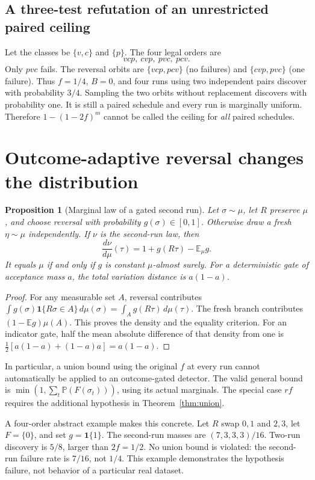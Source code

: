 \documentclass[11pt,a4paper]{article}
\newtheorem{proposition}[theorem]{Proposition}
\theoremstyle{definition}\newtheorem{definition}[theorem]{Definition}
\theoremstyle{remark}\newtheorem{remark}[theorem]{Remark}
\newcommand{\E}{\mathbb E}
\newcommand{\Prb}{\mathbb P}
\newcommand{\ind}{\mathbf 1}
\theoremstyle{definition}\newtheorem{xexample}[xtheorem]{Example}\theoremstyle{plain}
\providecommand{\ind}{\mathbf 1}
\begin{document}
\subsection{A three-test refutation of an unrestricted paired ceiling}
Let the classes be $\{v,c\}$ and $\{p\}$. The four legal orders are
\[
 vcp,\ cvp,\ pvc,\ pcv.
\]
Only $pvc$ fails. The reversal orbits are $\{vcp,pcv\}$ (no failures) and $\{cvp,pvc\}$ (one failure). Thus $f=1/4$, $B=0$, and four runs using two independent pairs discover with probability $3/4$. Sampling the two orbits without replacement discovers with probability one. It is still a paired schedule and every run is marginally uniform. Therefore $1-(1-2f)^m$ cannot be called the ceiling for \emph{all} paired schedules.

\section{Outcome-adaptive reversal changes the distribution}\label{sec:gate}
\begin{proposition}[Marginal law of a gated second run]\label{prop:gate}
Let $\sigma\sim\mu$, let $R$ preserve $\mu$, and choose reversal with probability $g(\sigma)\in[0,1]$. Otherwise draw a fresh $\eta\sim\mu$ independently. If $\nu$ is the second-run law, then
\begin{equation}\label{eq:gate}
 \frac{d\nu}{d\mu}(\tau)=1+g(R\tau)-\E_\mu g.
\end{equation}
It equals $\mu$ if and only if $g$ is constant $\mu$-almost surely. For a deterministic gate of acceptance mass $a$, the total variation distance is $a(1-a)$.
\end{proposition}
\begin{proof}
For any measurable set $A$, reversal contributes
$\int g(\sigma)\ind\{R\sigma\in A\}\,d\mu(\sigma)
=\int_A g(R\tau)\,d\mu(\tau)$.
The fresh branch contributes $(1-\E g)\mu(A)$. This proves the density and the equality criterion. For an indicator gate, half the mean absolute difference of that density from one is
$\tfrac12[a(1-a)+(1-a)a]=a(1-a)$.
\end{proof}
In particular, a union bound using the original $f$ at every run cannot automatically be applied to an outcome-gated detector. The valid general bound is $\min(1,\sum_t\Prb(F(\sigma_t)))$, using its actual marginals. The special case $rf$ requires the additional hypothesis in Theorem~\ref{thm:union}.

A four-order abstract example makes this concrete. Let $R$ swap $0,1$ and $2,3$, let $F=\{0\}$, and set $g=\ind\{1\}$. The second-run masses are $(7,3,3,3)/16$. Two-run discovery is $5/8$, larger than $2f=1/2$. No union bound is violated: the second-run failure rate is $7/16$, not $1/4$. This example demonstrates the hypothesis failure, not behavior of a particular real dataset.
\end{document}
